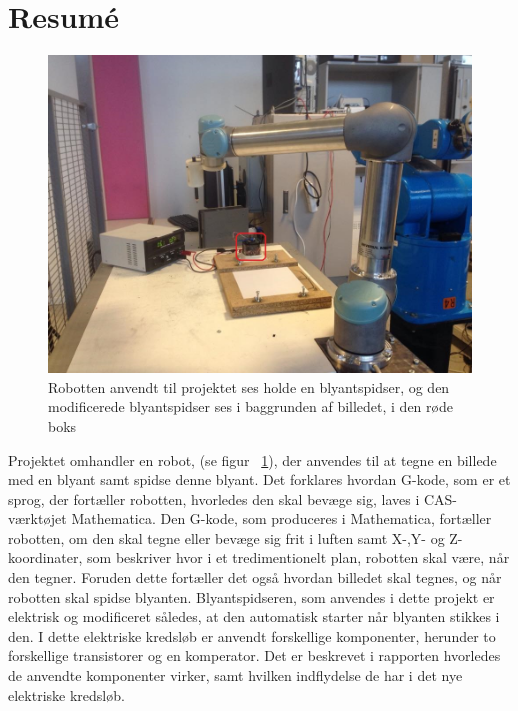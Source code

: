 

\section{Resumé}
\begin{figure}[h]
	\begin{center}
	\includegraphics[scale=0.4]{Billeder/UR-farver.jpg}
	\caption{Robotten anvendt til projektet ses holde en blyantspidser, og den modificerede blyantspidser ses i baggrunden af billedet, i den røde boks}\label{fig:opstilling}
	\end{center}
\end{figure}
Projektet omhandler en robot, (se figur ~\ref{fig:opstilling}), der anvendes til at tegne en billede med en blyant samt spidse denne blyant. Det forklares hvordan G-kode, som er et sprog, der fortæller robotten, hvorledes den skal bevæge sig, laves i CAS-værktøjet Mathematica. Den G-kode, som produceres i Mathematica, fortæller robotten, om den skal tegne eller bevæge sig frit i luften samt X-,Y- og Z-koordinater, som beskriver hvor i et tredimentionelt plan, robotten skal være, når den tegner. Foruden dette fortæller det også hvordan billedet skal tegnes, og når robotten skal spidse blyanten. Blyantspidseren, som anvendes i dette projekt er elektrisk og modificeret således, at den automatisk starter når blyanten stikkes i den. I dette elektriske kredsløb er anvendt forskellige komponenter, herunder to forskellige transistorer og en komperator. Det er beskrevet i rapporten hvorledes de anvendte komponenter virker, samt hvilken indflydelse de har i det nye elektriske kredsløb. 
